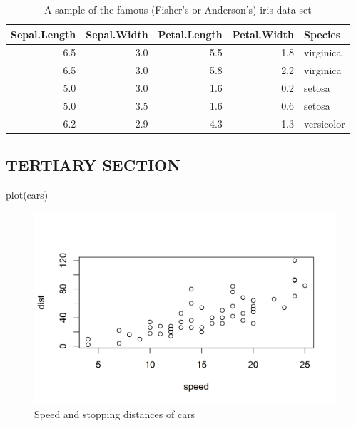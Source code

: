 \documentclass[
  12pt,
  a4paper,
  oneside]{tesesusp}
\newenvironment{Shaded}{\begin{snugshade}}{\end{snugshade}}
\newcommand{\FunctionTok}[1]{\textcolor[rgb]{0.28,0.35,0.67}{#1}}
\newcommand{\NormalTok}[1]{\textcolor[rgb]{0.00,0.23,0.31}{#1}}
\begin{document}
\begin{table}
\caption{A sample of the famous (Fisher's or Anderson's) iris data set}\tabularnewline

\centering
\begin{tabular}{r|r|r|r|l}
\hline
Sepal.Length & Sepal.Width & Petal.Length & Petal.Width & Species\\
\hline
6.5 & 3.0 & 5.5 & 1.8 & virginica\\
\hline
6.5 & 3.0 & 5.8 & 2.2 & virginica\\
\hline
5.0 & 3.0 & 1.6 & 0.2 & setosa\\
\hline
5.0 & 3.5 & 1.6 & 0.6 & setosa\\
\hline
6.2 & 2.9 & 4.3 & 1.3 & versicolor\\
\hline
\end{tabular}
\end{table}

\hypertarget{tertiary-section}{%
\subsection{TERTIARY SECTION}\label{tertiary-section}}

\begin{Shaded}
\begin{Highlighting}[numbers=left,,]
\FunctionTok{plot}\NormalTok{(cars)}
\end{Highlighting}
\end{Shaded}

\begin{figure}[H]

\caption{Speed and stopping distances of cars}

{\centering \includegraphics{index_files/figure-pdf/unnamed-chunk-3-1.png}

}

\end{figure}
\end{document}
